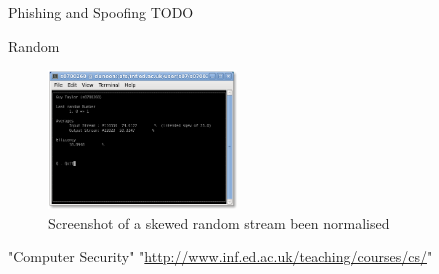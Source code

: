 \documentclass[11pt,twoside,a4paper]{article}
\begin{document}
  \clearpage
  
  \begin{section}{Phishing and Spoofing}
    TODO
  \end{section}
  
  \clearpage
  
  \begin{section}{Random}
    \begin{figure}[Vom_Noumann_screenshot]
      \centering
      \includegraphics[width=5cm]{von_noumann_screenshot}
      \caption{Screenshot of a skewed random stream been normalised}
    \end{figure}
  \end{section}
  
  \clearpage
  
  \begin{thebibliography}{9}
      "Computer Security" "\url{http://www.inf.ed.ac.uk/teaching/courses/cs/}"
  \end{thebibliography}
\end{document}
